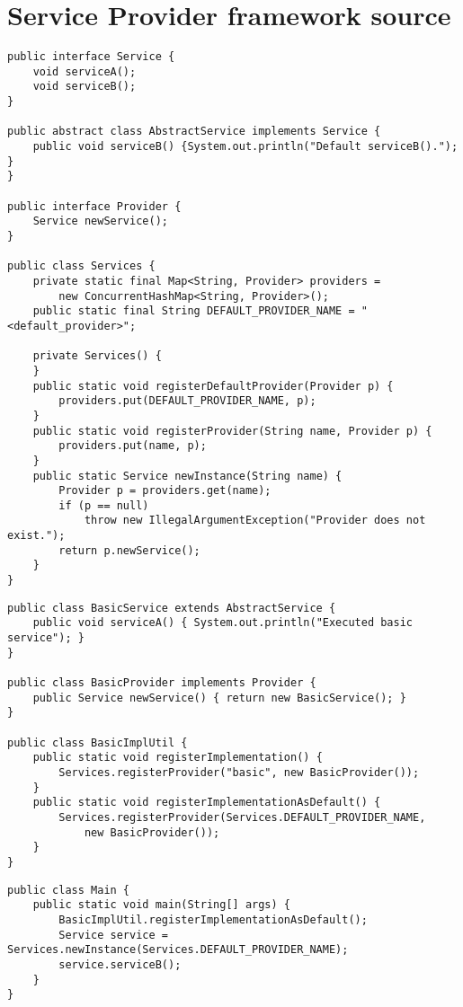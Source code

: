 \appendix
\chapter{Service Provider framework source}
\label{examplesource}

\begin{lstlisting}[caption=Classes of the \code{service} package]
public interface Service {
	void serviceA();
	void serviceB();
}

public abstract class AbstractService implements Service {
	public void serviceB() {System.out.println("Default serviceB()."); }
}

public interface Provider {
	Service newService();
}

public class Services {
	private static final Map<String, Provider> providers = 
		new ConcurrentHashMap<String, Provider>();
	public static final String DEFAULT_PROVIDER_NAME = "<default_provider>";
	
	private Services() {
	}
	public static void registerDefaultProvider(Provider p) { 
		providers.put(DEFAULT_PROVIDER_NAME, p); 
	}
	public static void registerProvider(String name, Provider p) { 
		providers.put(name, p); 
	}
	public static Service newInstance(String name) {
		Provider p = providers.get(name);
		if (p == null) 
			throw new IllegalArgumentException("Provider does not exist.");
		return p.newService();
	}
}
\end{lstlisting}

\begin{lstlisting}[caption=Classes of the \code{impl} package]
public class BasicService extends AbstractService {
	public void serviceA() { System.out.println("Executed basic service"); }
} 

public class BasicProvider implements Provider {
	public Service newService() { return new BasicService(); }
}

public class BasicImplUtil {
	public static void registerImplementation() { 
		Services.registerProvider("basic", new BasicProvider()); 
	}
	public static void registerImplementationAsDefault() { 
		Services.registerProvider(Services.DEFAULT_PROVIDER_NAME, 
			new BasicProvider()); 
	}
}
\end{lstlisting}

\begin{lstlisting}[caption=Classes of the \code{client} package]
public class Main {
	public static void main(String[] args) {
		BasicImplUtil.registerImplementationAsDefault();
		Service service = Services.newInstance(Services.DEFAULT_PROVIDER_NAME);
		service.serviceB();
	}
}
\end{lstlisting}

